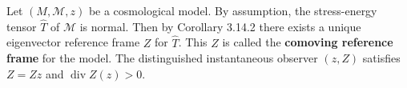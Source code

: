 Let $(M, \mathcal{M}, z)$ be a cosmological model. By assumption, the stress-energy tensor $\hat{T}$ of $\mathcal{M}$ is normal. Then by Corollary 3.14.2 there exists a unique eigenvector reference frame $Z$ for $\hat{T}$. This $Z$ is called the \textbf{comoving reference frame} for the model. The distinguished instantaneous observer $(z, Z)$ satisfies $Z = Zz$ and $\operatorname{div} Z(z) > 0$.
